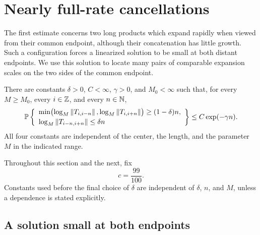 \section{Nearly full-rate cancellations}
\label{can:section}

The first estimate concerns two long products which expand rapidly when
viewed from their common endpoint, although their concatenation has little
growth.  Such a configuration forces a linearized solution to be small at
both distant endpoints.  We use this solution to locate many pairs of
comparable expansion scales on the two sides of the common endpoint.

\begin{theorem}\label{can:theorem}
There are constants $\delta>0$, $C<\infty$, $\gamma>0$, and $M_0<\infty$
such that, for every $M\ge M_0$, every $i\in\mathbb{Z}$, and every $n\in\mathbb{N}$,
\begin{equation}\label{can:event-bound}
\mathbb{P}\left\{
\begin{array}{l}
\min\bigl(\log_M\left\lVert T_{i,i-n}\right\rVert,
          \log_M\left\lVert T_{i,i+n}\right\rVert\bigr)\ge(1-\delta)n,\\[2pt]
\log_M\left\lVert T_{i-n,i+n}\right\rVert\le\delta n
\end{array}
\right\}
\le C\exp(-\gamma n).
\end{equation}
All four constants are independent of the center, the length, and the
parameter $M$ in the indicated range.
\end{theorem}

Throughout this section and the next, fix
\begin{equation}\label{can:c}
c=\frac{99}{100}.
\end{equation}
Constants used before the final choice of $\delta$ are independent of
$\delta$, $n$, and $M$, unless a dependence is stated explicitly.

\subsection{A solution small at both endpoints}

